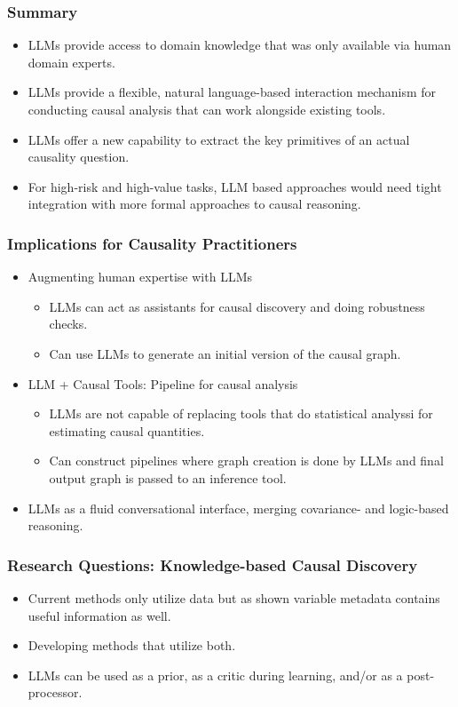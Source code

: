 \documentclass{beamer}
\begin{document}
\begin{frame}
	\frametitle{Summary}
	\begin{itemize}
		\item LLMs provide access to domain knowledge that was only available
			via human domain experts.
		\item LLMs provide a flexible, natural language-based interaction 
			mechanism for conducting causal analysis that can work
			alongside existing tools.
		\item LLMs offer a new capability to extract the key primitives of
			an actual causality question.
		\item For high-risk and high-value tasks, LLM based approaches would
			need tight integration with more formal approaches to
			causal reasoning.
	\end{itemize}
\end{frame}

\begin{frame}
	\frametitle{Implications for Causality Practitioners}
	\begin{itemize}
		\item Augmenting human expertise with LLMs
			\begin{itemize}
				\item LLMs can act as assistants for causal discovery and
					doing robustness checks.
				\item Can use LLMs to generate an initial version of
					the causal graph.
			\end{itemize}
		\item LLM + Causal Tools: Pipeline for causal analysis
			\begin{itemize}
				\item LLMs are not capable of replacing tools that do statistical analyssi for estimating causal quantities.
				\item Can construct pipelines where graph creation is
					done by LLMs and final output graph is passed to
					an inference tool.
			\end{itemize}
		\item LLMs as a fluid conversational interface, merging covariance-
			and logic-based reasoning.
	\end{itemize}
\end{frame}

\begin{frame}
	\frametitle{Research Questions: Knowledge-based Causal Discovery}
	\begin{itemize}
		\item Current methods only utilize data but as shown variable
			metadata contains useful information as well.
		\item Developing methods that utilize both.
		\item LLMs can be used as a prior, as a critic during learning, and/or
			as a post-processor.
	\end{itemize}
\end{frame}
\end{document}
